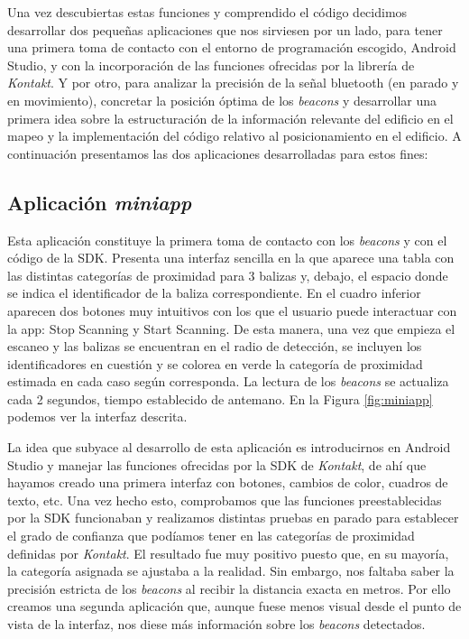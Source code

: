 Una vez descubiertas estas funciones y comprendido el código decidimos desarrollar dos pequeñas aplicaciones que nos sirviesen por un lado, para tener una primera toma de contacto con el entorno de programación escogido, Android Studio, y con la incorporación de las funciones ofrecidas por la librería de \textit{Kontakt}. Y por otro, para analizar la precisión de la señal bluetooth (en parado y en movimiento), concretar la posición óptima de los \textit{beacons} y desarrollar una primera idea sobre la estructuración de la información relevante del edificio en el mapeo y la implementación del código relativo al posicionamiento en el edificio. A continuación presentamos las dos aplicaciones desarrolladas para estos fines:


\subsection{Aplicación \textit{miniapp}}
Esta aplicación constituye la primera toma de contacto con los \textit{beacons} y con el código de la SDK. Presenta una interfaz sencilla en la que aparece una tabla con las distintas categorías de proximidad para 3 balizas y, debajo, el espacio donde se indica el identificador de la baliza correspondiente. En el cuadro inferior aparecen dos botones muy intuitivos con los que el usuario puede interactuar con la app: Stop Scanning y Start Scanning. De esta manera, una vez que empieza el escaneo y las balizas se encuentran en el radio de detección, se incluyen los identificadores en cuestión y se colorea en verde la categoría de proximidad estimada en cada caso según corresponda. La lectura de los \textit{beacons} se actualiza cada 2 segundos, tiempo establecido de antemano. En la Figura \ref{fig:miniapp} podemos ver la interfaz descrita.

La idea que subyace al desarrollo de esta aplicación es introducirnos en Android Studio y manejar las funciones ofrecidas por la SDK de \textit{Kontakt}, de ahí que hayamos creado una primera interfaz con botones, cambios de color, cuadros de texto, etc. Una vez hecho esto, comprobamos que las funciones preestablecidas por la SDK funcionaban y realizamos distintas pruebas en parado para establecer el grado de confianza que podíamos tener en las categorías de proximidad definidas por \textit{Kontakt}. El resultado fue muy positivo puesto que, en su mayoría, la categoría asignada se ajustaba a la realidad. Sin embargo, nos faltaba saber la precisión estricta de los \textit{beacons} al recibir la distancia exacta en metros. Por ello creamos una segunda aplicación que, aunque fuese menos visual desde el punto de vista de la interfaz, nos diese más información sobre los \textit{beacons} detectados.

